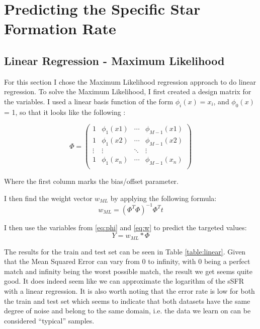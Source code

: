 \documentclass{article}
\theoremstyle{plain}
\theoremstyle{nonumberplain}
\begin{document}

\pagestyle{fancy}
\lhead{}
\chead{\leftmark}
\rhead{}
\cfoot{}

\section{Predicting the Specific Star Formation Rate}

\subsection{Linear Regression - Maximum Likelihood}

For this section I chose the Maximum Likelihood regression approach to do linear regression.
To solve the Maximum Likelihood, I first created a design matrix for the variables. 
I used a linear basis function of the form $\phi_i(x) = x_i$, and $\phi_0(x)$ = 1, so that it looks like the following : \medskip

\begin{equation} \label{eq:phi}
\Phi =
 \begin{pmatrix}
  1 & \phi_1(x1) & \cdots & \phi_{M-1}(x1) \\
  1 & \phi_1(x2) & \cdots & \phi_{M-1}(x2) \\
  \vdots  & \vdots  & \ddots & \vdots  \\
  1 & \phi_1(x_n) & \cdots & \phi_{M-1}(x_n) \\
 \end{pmatrix}
\end{equation}
\medskip

Where the first column marks the bias/offset parameter.

I then find the weight vector $w_{ML}$ by applying the following formula:
\medskip
\begin{equation} \label{eq:w}
w_{ML}=(\Phi^T \Phi)^{-1} \Phi^T t
\end{equation}
\medskip

I then use the variables from \eqref{eq:phi} and \eqref{eq:w} to predict the targeted values:
\begin{equation}
Y = w_{ML} * \Phi
\end{equation}


\noindent The results for the train and test set can be seen in Table \ref{table:linear}. 
Given that the Mean Squared Error can vary from 0 to infinity, with 0 being a perfect match and infinity being the worst possible match, the result we get seems quite good. 
It does indeed seem like we can approximate the logarithm of the sSFR with a linear regression. 
It is also worth noting that the error rate is low for both the train and test set which seems to indicate that both datasets have the same degree of noise and belong to the same domain, i.e. the data we learn on can be considered ``typical'' samples.  
\end{document}
